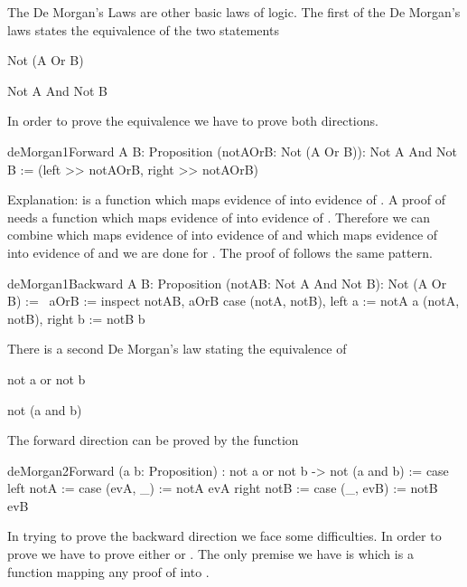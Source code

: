The De Morgan's Laws are other basic laws of logic. The first of the De
Morgan's laws states the equivalence of the two statements
\begin{alba}
    Not (A Or B)

    Not A And Not B
\end{alba}
%
In order to prove the equivalence we have to prove both directions.
\begin{alba}
    deMorgan1Forward
        {A B: Proposition} (notAOrB: Not (A Or B)): Not A And Not B
    :=
        (left >> notAOrB, right >> notAOrB)
\end{alba}
%
Explanation:  is a function which maps evidence of 
into evidence of . A proof of  needs a function which
maps evidence of  into evidence of . Therefore we can
combine  which maps evidence of  into evidence of  and  which maps evidence of  into evidence of
 and we are done for . The proof of  follows
the same pattern.



\begin{alba}
    deMorgan1Backward
        {A B: Proposition} (notAB: Not A And Not B): Not (A Or B)
    :=
        \ aOrB :=
            inspect notAB, aOrB case
                (notA, notB), left a :=
                    notA a
                (notA, notB), right b :=
                    notB b
\end{alba}


There is a second De Morgan's law stating the equivalence of
\begin{alba}
  not a or not b

  not (a and b)
\end{alba}

The forward direction can be proved by the function
\begin{alba}
    deMorgan2Forward
        (a b: Proposition)
        : not a or not b -> not (a and b)
    :=
        case
            left notA :=
                case
                    (evA, _) :=
                        notA evA
            right notB :=
                case
                    (_, evB) :=
                        notB evB
\end{alba}


In trying to prove the backward direction we face some difficulties. In order
to prove  we have to prove either  or
. The only premise we have is  which is a
function mapping any proof of  into .


